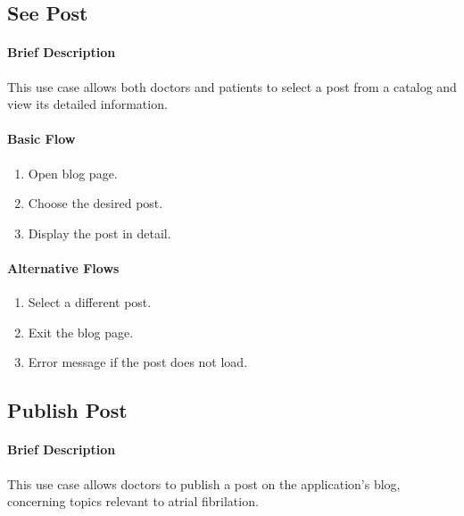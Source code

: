 \documentclass{report}
\begin{document}
\subsection{See Post}
\paragraph{Brief Description}
This use case allows both doctors and patients to select a post from a catalog and view its detailed information.

\begin{multicols}{2}
    \paragraph{Basic Flow}
    \begin{enumerate}
        \item Open blog page.
        \item Choose the desired post.
        \item Display the post in detail.
    \end{enumerate}
    \columnbreak

    \paragraph{Alternative Flows}
    \begin{enumerate}[label=A\arabic*.]
        \item Select a different post.
        \item Exit the blog page.
        \item Error message if the post does not load.
    \end{enumerate}
\end{multicols}

\vspace{1em}
\subsection{Publish Post}
\paragraph{Brief Description}
This use case allows doctors to publish a post on the application's blog, concerning topics relevant to atrial fibrilation.
\end{document}
